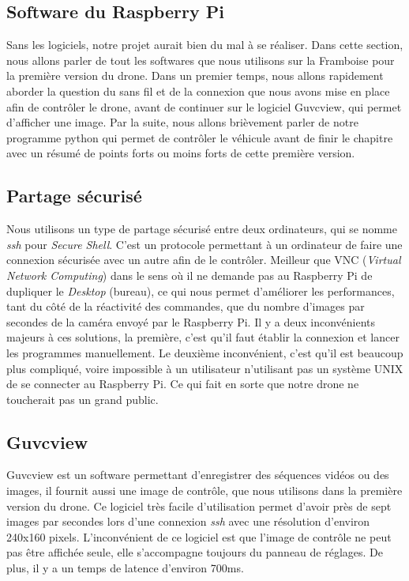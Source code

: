 \documentclass[a4paper,11pt]{report}
\begin{document}
{\begin{enumerate}
\begin{enumerate}
\section{Software du Raspberry Pi}

Sans les logiciels, notre projet aurait bien du mal à se réaliser. Dans cette section, nous allons parler de tout les softwares que nous utilisons sur la Framboise pour la première version du drone. Dans un premier temps, nous allons rapidement aborder la question du sans fil et de la connexion que nous avons mise en place afin de contrôler le drone, avant de continuer sur le logiciel Guvcview, qui permet d'afficher une image. Par la suite, nous allons brièvement parler de notre programme python qui permet de contrôler le véhicule avant de finir le chapitre avec un résumé de points forts ou moins forts de cette première version.





\subsection{Partage sécurisé}

Nous utilisons un type de partage sécurisé entre deux ordinateurs, qui se nomme \textit{ssh} pour \textit{Secure Shell}. C'est un protocole permettant à un ordinateur de faire une connexion sécurisée avec un autre afin de le contrôler. Meilleur que VNC (\textit{Virtual Network Computing}) dans le sens où il ne demande pas au Raspberry Pi de dupliquer le \textit{Desktop} (bureau), ce qui nous permet d'améliorer les performances, tant du côté de la réactivité des commandes, que du nombre d'images par secondes de la caméra envoyé par le Raspberry Pi. Il y a deux inconvénients majeurs à ces solutions, la première, c'est qu'il faut établir la connexion et lancer les programmes manuellement. Le deuxième inconvénient, c'est qu'il est beaucoup plus compliqué, voire impossible à un utilisateur n'utilisant pas un système UNIX de se connecter au Raspberry Pi. Ce qui fait en sorte que notre drone ne toucherait pas un grand public.

\subsection{Guvcview}

Guvcview\label{Guvcview} est un software permettant d'enregistrer des séquences vidéos ou des images, il fournit aussi une image de contrôle, que nous utilisons dans la première version du drone. Ce logiciel très facile d'utilisation permet d'avoir près de sept images par secondes lors d'une connexion \textit{ssh} avec une résolution d'environ 240x160 pixels. L'inconvénient de ce logiciel est que l'image de contrôle ne peut pas être affichée seule, elle s'accompagne toujours du panneau de réglages. De plus, il y a un temps de latence d'environ 700ms. 


\end{enumerate}
\end{enumerate}}
\end{document}
